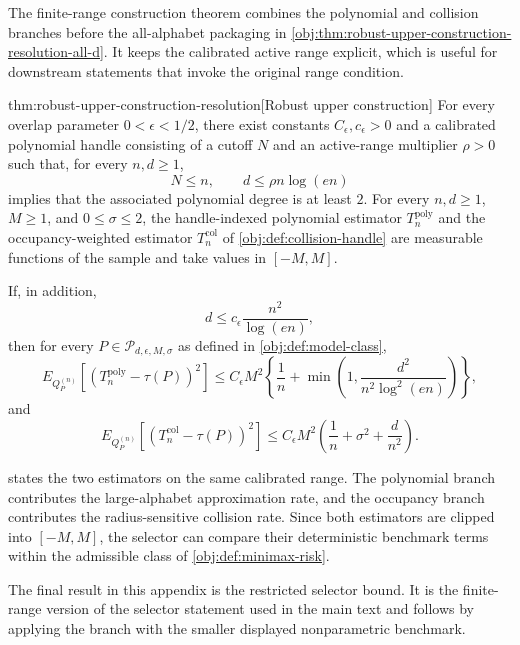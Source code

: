 \documentclass[11pt]{article}
\begin{document}
The finite-range construction theorem combines the polynomial and collision branches before the all-alphabet packaging in \cref{obj:thm:robust-upper-construction-resolution-all-d}. It keeps the calibrated active range explicit, which is useful for downstream statements that invoke the original range condition.

\begin{theoremv}{thm:robust-upper-construction-resolution}[Robust upper construction]
For every overlap parameter \(0<\epsilon<1/2\), there exist constants \(C_{\epsilon},c_{\epsilon}>0\) and a calibrated polynomial handle consisting of a cutoff \(N\) and an active-range multiplier \(\rho>0\) such that, for every \(n,d\ge 1\),
\[
N\le n,\qquad d\le \rho n\log(en)
\]
implies that the associated polynomial degree is at least \(2\). For every \(n,d\ge 1\), \(M\ge 1\), and \(0\le \sigma\le 2\), the handle-indexed polynomial estimator \(T_n^{\mathrm{poly}}\) and the occupancy-weighted estimator \(T_n^{\mathrm{col}}\) of \cref{obj:def:collision-handle} are measurable functions of the sample and take values in \([-M,M]\).

If, in addition,
\[
d\le c_{\epsilon}\frac{n^2}{\log(en)},
\]
then for every \(P\in\mathcal P_{d,\epsilon,M,\sigma}\) as defined in \cref{obj:def:model-class},
\[
E_{Q_P^{(n)}}\!\left[\left(T_n^{\mathrm{poly}}-\tau(P)\right)^2\right]
\le
C_{\epsilon}M^2
\left\{
\frac1n+\min\left(1,\frac{d^2}{n^2\log^2(en)}\right)
\right\},
\]
and
\[
E_{Q_P^{(n)}}\!\left[\left(T_n^{\mathrm{col}}-\tau(P)\right)^2\right]
\le
C_{\epsilon}M^2
\left(
\frac1n+\sigma^2+\frac{d}{n^2}
\right).
\]
\end{theoremv}

 states the two estimators on the same calibrated range. The polynomial branch contributes the large-alphabet approximation rate, and the occupancy branch contributes the radius-sensitive collision rate. Since both estimators are clipped into \([-M,M]\), the selector can compare their deterministic benchmark terms within the admissible class of \cref{obj:def:minimax-risk}.

The final result in this appendix is the restricted selector bound. It is the finite-range version of the selector statement used in the main text and follows by applying the branch with the smaller displayed nonparametric benchmark.
\end{document}
